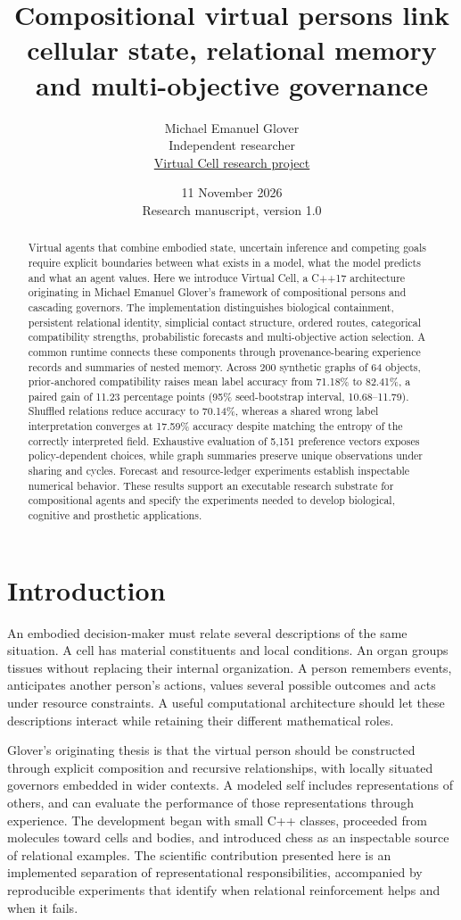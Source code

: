 \documentclass[10pt,a4paper]{article}
\title{\sffamily\bfseries Compositional virtual persons link cellular state, relational memory and multi-objective governance}
\author{Michael Emanuel Glover\\\small Independent researcher\\\small \href{https://rmichaelglover.github.io/hrl-portfolio/virtual-cell-model/}{Virtual Cell research project}}
\date{11 November 2026\\\small Research manuscript, version 1.0}
\begin{document}
\maketitle
\begin{abstract}
Virtual agents that combine embodied state, uncertain inference and competing goals require explicit boundaries between what exists in a model, what the model predicts and what an agent values. Here we introduce Virtual Cell, a C++17 architecture originating in Michael Emanuel Glover's framework of compositional persons and cascading governors. The implementation distinguishes biological containment, persistent relational identity, simplicial contact structure, ordered routes, categorical compatibility strengths, probabilistic forecasts and multi-objective action selection. A common runtime connects these components through provenance-bearing experience records and summaries of nested memory. Across 200 synthetic graphs of 64 objects, prior-anchored compatibility raises mean label accuracy from 71.18\% to 82.41\%, a paired gain of 11.23 percentage points (95\% seed-bootstrap interval, 10.68--11.79). Shuffled relations reduce accuracy to 70.14\%, whereas a shared wrong label interpretation converges at 17.59\% accuracy despite matching the entropy of the correctly interpreted field. Exhaustive evaluation of 5,151 preference vectors exposes policy-dependent choices, while graph summaries preserve unique observations under sharing and cycles. Forecast and resource-ledger experiments establish inspectable numerical behavior. These results support an executable research substrate for compositional agents and specify the experiments needed to develop biological, cognitive and prosthetic applications.
\end{abstract}

\section*{Introduction}
An embodied decision-maker must relate several descriptions of the same situation. A cell has material constituents and local conditions. An organ groups tissues without replacing their internal organization. A person remembers events, anticipates another person's actions, values several possible outcomes and acts under resource constraints. A useful computational architecture should let these descriptions interact while retaining their different mathematical roles.

Glover's originating thesis is that the virtual person should be constructed through explicit composition and recursive relationships, with locally situated governors embedded in wider contexts. A modeled self includes representations of others, and can evaluate the performance of those representations through experience. The development began with small C++ classes, proceeded from molecules toward cells and bodies, and introduced chess as an inspectable source of relational examples. The scientific contribution presented here is an implemented separation of representational responsibilities, accompanied by reproducible experiments that identify when relational reinforcement helps and when it fails.
\end{document}
